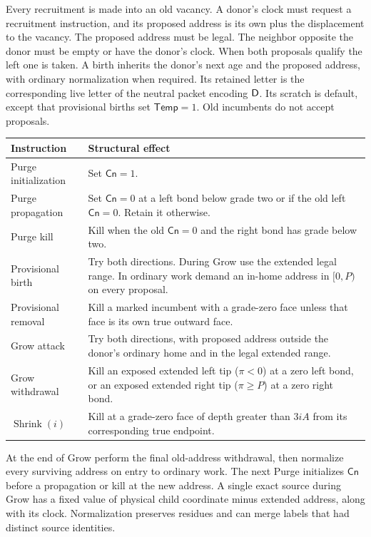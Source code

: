 Every recruitment is made into an old vacancy. A donor's clock must request a recruitment instruction, and its proposed address is its own plus the displacement to the vacancy. The proposed address must be legal. The neighbor opposite the donor must be empty or have the donor's clock. When both proposals qualify the left one is taken. A birth inherits the donor's next age and the proposed address, with ordinary normalization when required. Its retained letter is the corresponding live letter of the neutral packet encoding \(\mathsf D\). Its scratch is default, except that provisional births set \(\mathsf{Temp}=1\). Old incumbents do not accept proposals.

\begin{center}
\begin{tabular}{@{}p{.25\linewidth}p{.68\linewidth}@{}}
\toprule
Instruction & Structural effect \\
\midrule
Purge initialization & Set \(\mathsf{Cn}=1\). \\
Purge propagation & Set \(\mathsf{Cn}=0\) at a left bond below grade two or if the old left \(\mathsf{Cn}=0\). Retain it otherwise. \\
Purge kill & Kill when the old \(\mathsf{Cn}=0\) and the right bond has grade below two. \\
Provisional birth & Try both directions. During Grow use the extended legal range. In ordinary work demand an in-home address in \([0,P)\) on every proposal. \\
Provisional removal & Kill a marked incumbent with a grade-zero face unless that face is its own true outward face. \\
Grow attack & Try both directions, with proposed address outside the donor's ordinary home and in the legal extended range. \\
Grow withdrawal & Kill an exposed extended left tip (\(\pi<0\)) at a zero left bond, or an exposed extended right tip (\(\pi\ge P\)) at a zero right bond. \\
\(\operatorname{Shrink}(i)\) & Kill at a grade-zero face of depth greater than \(3iA\) from its corresponding true endpoint. \\
\bottomrule
\end{tabular}
\end{center}
At the end of Grow perform the final old-address withdrawal, then normalize every surviving address on entry to ordinary work. The next Purge initializes \(\mathsf{Cn}\) before a propagation or kill at the new address. A single exact source during Grow has a fixed value of physical child coordinate minus extended address, along with its clock. Normalization preserves residues and can merge labels that had distinct source identities.

